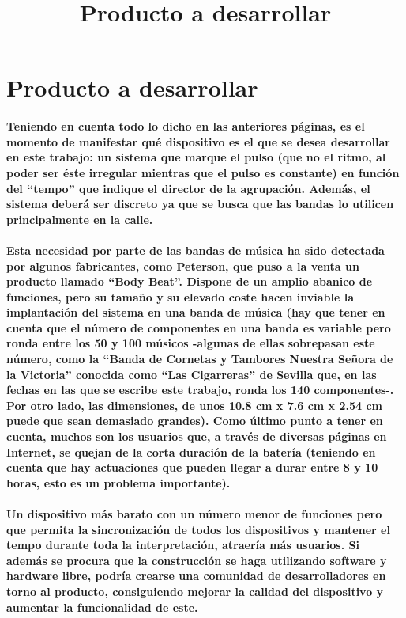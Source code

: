 \title{Producto a desarrollar}
\section{Producto a desarrollar}

\paragraph{
Teniendo en cuenta todo lo dicho en las anteriores páginas, es el momento de manifestar qué dispositivo es el que se desea desarrollar en este trabajo: un sistema que marque el pulso (que no el ritmo, al poder ser éste irregular mientras que el pulso es constante) en función del “tempo” que indique el director de la agrupación. Además, el sistema deberá ser discreto ya que se busca que las bandas lo utilicen principalmente en la calle.
}

\paragraph{
Esta necesidad por parte de las bandas de música ha sido detectada por algunos fabricantes, como Peterson, que puso a la venta un producto llamado “Body Beat”. Dispone de un amplio abanico de funciones, pero su tamaño y su elevado coste hacen inviable la implantación del sistema en una banda de música (hay que tener en cuenta que el número de componentes en una banda es variable pero ronda entre los 50 y 100 músicos -algunas de ellas sobrepasan este número, como la “Banda de Cornetas y Tambores Nuestra Señora de la Victoria” conocida como “Las Cigarreras” de Sevilla \cite{cigarreras} que, en las fechas en las que se escribe este trabajo, ronda los 140 componentes-. Por otro lado, las dimensiones, de unos 10.8 cm x 7.6 cm x 2.54 cm puede que sean demasiado grandes). Como último punto a tener en cuenta, muchos son los usuarios que, a través de diversas páginas en Internet, se quejan de la corta duración de la batería (teniendo en cuenta que hay actuaciones que pueden llegar a durar entre 8 y 10 horas, esto es un problema importante).
}

\paragraph{
Un dispositivo más barato con un número menor de funciones pero que permita la sincronización de todos los dispositivos y mantener el tempo durante toda la interpretación, atraería más usuarios. Si además se procura que la construcción se haga utilizando software y hardware libre, podría crearse una comunidad de desarrolladores en torno al producto, consiguiendo mejorar la calidad del dispositivo y aumentar la funcionalidad de este.
}
